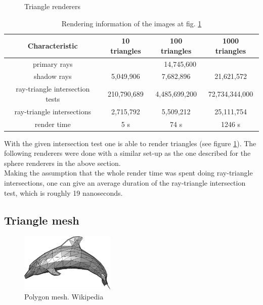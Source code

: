 \documentclass{article}
\begin{document}
\begin{figure}[h]
	\caption{Triangle renderers}
	\label{fig:triangles}
\end{figure}

\begin{table}[!ht]
\centering
	\begin{tabular}{*4c} 
		\hline
 		Characteristic & 10 triangles & 100 triangles & 1000 triangles \\ [0.5ex] 
 		\hline\hline
 		primary rays & \multicolumn{3}{c}{14,745,600} \\ 
 		shadow rays & 5,049,906 & 7,682,896 & 21,621,572 \\
 		ray-triangle intersection tests & 210,790,689 & 4,485,699,200 & 72,734,344,000 \\
 		ray-triangle intersections & 2,715,792 & 5,509,212 & 25,111,754 \\
 		render time & 5 s & 74 s & 1246 s \\
 		\hline
	\end{tabular}
\caption{Rendering information of the images at fig. \ref{fig:triangles}}
\label{table:triangle_renders}
\end{table}

With the given intersection test one is able to render triangles (see figure \ref{fig:triangles}). The following renderers were done with a similar set-up as the one described for the sphere renderers in the above section. \\
Making the assumption that the whole render time was spent doing ray-triangle intersections, one can give an average duration of the ray-triangle intersection test, which is roughly 19 nanoseconds.

\subsection{Triangle mesh}

\begin{figure} 
    \centering
    \includegraphics[width=0.4\textwidth]{dolphinPoly}
    \caption{Polygon mesh. Wikipedia}
    \label{fig:poly_mesh}
\end{figure}
\end{document}
